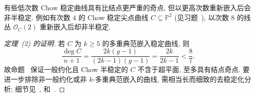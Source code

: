 \begin{remark}\label{src:6.8.27}
有些低次数 Chow 稳定曲线具有比结点更严重的奇点, 但以更高次数重新嵌入后会非半稳定. 例如有次数 $4$ 的 Chow 稳定尖点曲线 $C\subseteq\mathbb P^2$ (见习题~), 以次数 $8$ 的线丛 $\mathcal O_C(2)$ 重新嵌入后却非半稳定.
\end{remark}
\begin{proof}[定理~(2) 的证明]
若 $C$ 为 $k\geq5$ 的多重典范嵌入稳定曲线, 则
\[
\frac{\deg C}{n+1}=\frac{2k(g-1)}{(2k-1)(g-1)}=\frac{2k}{2k-1}<\frac87.
\]
故命题~ 保证一般约化且 Chow 半稳定的 $C$ 不含于超平面, 至多具有结点奇点. 要进一步排除非一般约化或非 $k$-多重典范嵌入的曲线, 需相当长而细致的去稳定化分析; 细节见~\cite[\S5]{Mum77}, \cite[\S1]{Gie82} 和~\cite[定理 4.45]{HM98}.
\end{proof}

